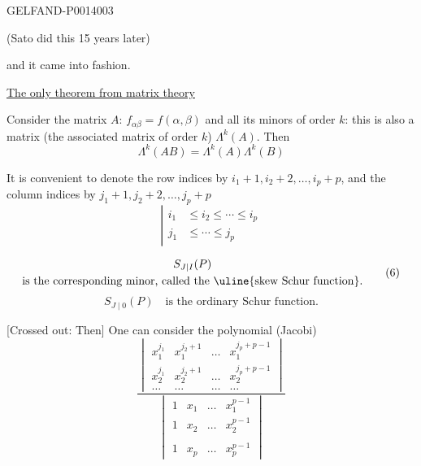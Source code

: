\begin{GelfandAdjacentEvidence}{GELFAND-P001400}{3}



(Sato did this 15 years later)

and it came into fashion.

\uline{The only theorem from matrix theory}

Consider the matrix \(A\): \(f_{\alpha\beta}=f(\alpha,\beta)\)
and all its minors of order \(k\): this is also a matrix (the associated matrix of order \(k\)) \(\Lambda^k(A)\). Then
\begin{equation*}
\Lambda^k(AB)=\Lambda^k(A)\Lambda^k(B) \tag{5}
\end{equation*}

It is convenient to denote the row indices by \(i_1+1,i_2+2,\ldots,i_p+p\), and the column indices by
\(j_1+1,j_2+2,\ldots,j_p+p\)
\[
\left|\begin{aligned}
i_1&\le i_2\le\cdots\le i_p\\
j_1&\le\cdots\le j_p
\end{aligned}\right.
\]

\begin{equation*}
\begin{gathered}
S_{J\mid I}(P)\\
\text{is the corresponding minor, called the }\text{\uline{skew Schur function}}.
\end{gathered} \tag{6}
\end{equation*}
\[
S_{J\mid 0}(P)\quad\text{is the ordinary Schur function.}
\]

[Crossed out: Then] One can consider the polynomial (Jacobi)
\begin{equation*}
\frac{\begin{vmatrix}
x_1^{j_1}&x_1^{j_2+1}&\ldots&x_1^{j_p+p-1}\\
x_2^{j_1}&x_2^{j_2+1}&\ldots&x_2^{j_p+p-1}\\
\ldots&\ldots&\ldots&\ldots
\end{vmatrix}}{\begin{vmatrix}
1&x_1&\ldots&x_1^{p-1}\\
1&x_2&\ldots&x_2^{p-1}\\
&&&\\
1&x_p&\ldots&x_p^{p-1}
\end{vmatrix}} \tag{7}
\end{equation*}
\end{GelfandAdjacentEvidence}

